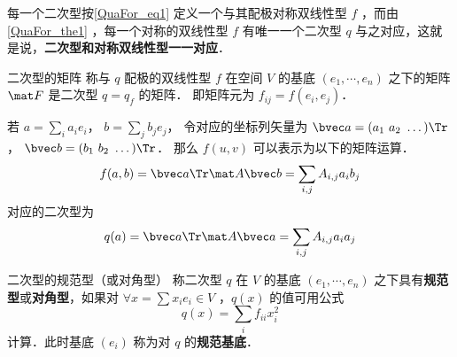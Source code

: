 每一个二次型按\autoref{QuaFor_eq1} 定义一个与其配极对称双线性型 $f$ ，而由\autoref{QuaFor_the1} ，每一个对称的双线性型 $f$ 有唯一一个二次型 $q$ 与之对应，这就是说，\textbf{二次型和对称双线性型一一对应}．

\begin{definition}{二次型的矩阵}
称与 $q$ 配极的双线性型 $f$ 在空间 $V$ 的基底 $(e_1,\cdots,e_n)$ 之下的矩阵 $\mat F$ 是二次型 $q=q_f$ 的矩阵． 即矩阵元为 $f_{ij} = f(e_i, e_j)$．
\end{definition}

若 $a = \sum_i a_i e_i$， $b = \sum_j b_j e_j$， 令对应的坐标列矢量为 $\bvec a = (a_1\ a_2\ \dots)\Tr$， $\bvec b = (b_1\ b_2\ \dots)\Tr$． 那么 $f(u, v)$ 可以表示为以下的矩阵运算．
\begin{equation}
f(a, b) = \bvec a\Tr \mat A \bvec b = \sum_{i,j} A_{i,j}a_i b_j
\end{equation}
对应的二次型为
\begin{equation}
q(a) = \bvec a\Tr \mat A \bvec a = \sum_{i,j} A_{i,j}a_i a_j
\end{equation}

\begin{definition}{二次型的规范型（或对角型）}
称二次型 $q$ 在 $V$ 的基底 $(e_1,\cdots,e_n)$ 之下具有\textbf{规范型}或\textbf{对角型}，如果对 $\forall x=\sum x_i e_i\in V$ ，$q(x)$ 的值可用公式
\begin{equation}
q(x)=\sum_{i}f_{ii}x_i^2
\end{equation}
计算．此时基底 $(e_i)$ 称为对 $q$ 的\textbf{规范基底}．
\end{definition}